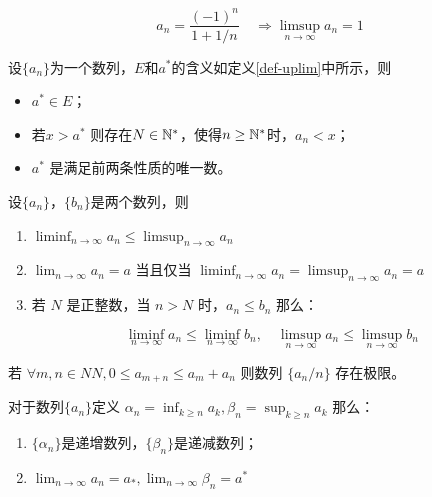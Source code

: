 \begin{example} 
	$$
	a_n = \frac{(-1)^n}{1 + 1/n} \quad \Rightarrow \limsup_{n\rightarrow \infty} a_n = 1
	$$
\end{example}

\begin{theorem}
	设$\{a_n\}$为一个数列，$E$和$a^*$的含义如定义\ref{def-uplim}中所示，则
	\begin{itemize}
		\item $a^*\in E$；
		\item 若$x>a^*$ 则存在$N\in \mathbb{N}^*$，使得$n\ge \mathbb{N}^*$时，$a_n < x$；
		\item $a^*$ 是满足前两条性质的唯一数。
	\end{itemize}
\end{theorem}


\begin{theorem}
	设$\{a_n\}$，$\{b_n\}$是两个数列，则
	\begin{enumerate}
		\item $\liminf_{n\rightarrow \infty} a_n \le \limsup_{n\rightarrow \infty} a_n$
		\item $\lim_{n\rightarrow \infty} a_n = a$ 当且仅当 $\liminf_{n\rightarrow \infty} a_n = \limsup_{n\rightarrow \infty} a_n = a$
		\item 若 $N$ 是正整数，当 $n > N$ 时，$a_n \le b_n$ 那么：
		
		$$
		\liminf_{n\rightarrow \infty} a_n \le \liminf_{n\rightarrow \infty}  b_n,\quad 
		\limsup_{n\rightarrow \infty} a_n \le \limsup_{n\rightarrow \infty} b_n
		$$
	\end{enumerate}
\end{theorem}

\begin{example}
	若 $\forall m,n\in NN, 0 \le a_{m+n} \le a_m + a_n$ 则数列 $\{a_n/n\}$ 存在极限。
\end{example}


\begin{theorem}
	对于数列$\{a_n\}$定义 $\alpha_n = \inf_{k\ge n}a_k,\beta_n = \sup_{k\ge n}a_k$ 那么：
	
	\begin{enumerate}
		\item $\{\alpha_n\}$是递增数列，$\{\beta_n\}$是递减数列；
		\item $\lim_{n\rightarrow \infty} a_n = a_*, \lim_{n\rightarrow \infty} \beta_n = a^*$
	\end{enumerate}
\end{theorem}

